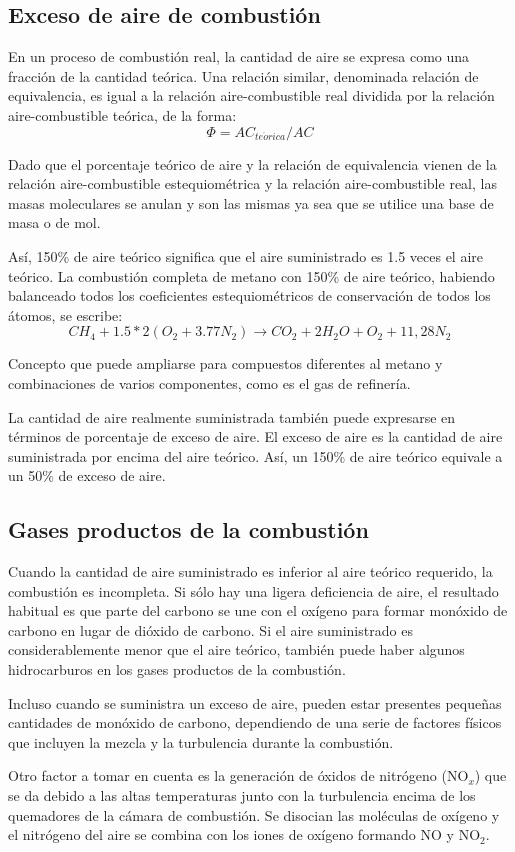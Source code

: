 \subsection{Exceso de aire de combustión}
\par En un proceso de combustión real, la cantidad de aire se expresa como una fracción de la cantidad teórica. Una relación similar, denominada relación de equivalencia, es igual a la relación aire-combustible real dividida por la relación aire-combustible teórica, de la forma:
\begin{equation}
    \Phi = AC_{te\acute{o}rica}/AC
\end{equation}
\par Dado que el porcentaje teórico de aire y la relación de equivalencia vienen de la relación aire-combustible estequiométrica y la relación aire-combustible real, las masas moleculares se anulan y son las mismas ya sea que se utilice una base de masa o de mol.
\par Así, 150\% de aire teórico significa que el aire suministrado es 1.5 veces el aire teórico. La combustión completa de metano con 150\% de aire teórico, habiendo balanceado todos los coeficientes estequiométricos de conservación de todos los átomos, se escribe:
\begin{equation}
CH_4 + 1.5*2(O_2 + 3.77N_2 ) \rightarrow CO_2 + 2H_2O + O_2 + 11,28N_2
\end{equation}
\par Concepto que puede ampliarse para compuestos diferentes al metano y combinaciones de varios componentes, como es el gas de refinería.
\par La cantidad de aire realmente suministrada también puede expresarse en términos de porcentaje de exceso de aire. El exceso de aire es la cantidad de aire suministrada por encima del aire teórico. Así, un 150\% de aire teórico equivale a un 50\% de exceso de aire.

\subsection{Gases productos de la combustión}
\par Cuando la cantidad de aire suministrado es inferior al aire teórico requerido, la combustión es incompleta. Si sólo hay una ligera deficiencia de aire, el resultado habitual es que parte del carbono se une con el oxígeno para formar monóxido de carbono en lugar de dióxido de carbono. Si el aire suministrado es considerablemente menor que el aire teórico, también puede haber algunos hidrocarburos en los gases productos de la combustión.
\par Incluso cuando se suministra un exceso de aire, pueden estar presentes pequeñas cantidades de monóxido de carbono, dependiendo de una serie de factores físicos que incluyen la mezcla y la turbulencia durante la combustión. 
\par Otro factor a tomar en cuenta es la generación de óxidos de nitrógeno (NO$_x$) que se da debido a las altas temperaturas junto con la turbulencia encima de los quemadores de la cámara de combustión. Se disocian las moléculas de oxígeno y el nitrógeno del aire se combina con los iones de oxígeno formando NO y NO$_2$.

